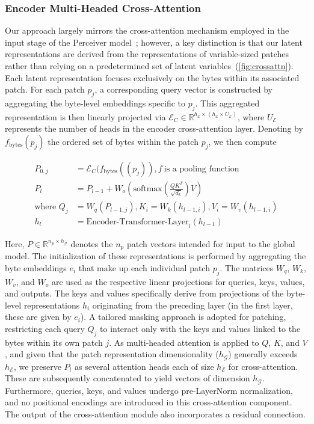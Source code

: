 \subsubsection{Encoder Multi-Headed Cross-Attention}
\label{sec:enc-cross-attn}
Our approach largely mirrors the cross-attention mechanism employed in the input stage of the Perceiver model~\citep{jaegle2021perceiver}; however, a key distinction is that our latent representations are derived from the representations of variable-sized patches rather than relying on a predetermined set of latent variables~(\autoref{fig:crossattn}). Each latent representation focuses exclusively on the bytes within its associated patch. For each patch $p_j$, a corresponding query vector is constructed by aggregating the byte-level embeddings specific to $p_j$. This aggregated representation is then linearly projected via $\mathcal{E}_{C} \in \mathbb{R}^{h_{\mathcal{E}} \times (h_{\mathcal{E}} \times U_{\mathcal{E}})}$, where $U_{\mathcal{E}}$ represents the number of heads in the encoder cross-attention layer. Denoting by $f_{\text{bytes}}(p_j)$ the ordered set of bytes within the patch $p_j$, we then compute

\begin{align}
P_{0,j} &= \mathcal{E}_{C}(f_\text{bytes}((p_j)), f~ \text{is a pooling function} \\
P_l &= P_{l-1} + W_o\left(\text{softmax}\left(\frac{QK^T}{\sqrt{d_k}}\right)V\right) \\
\text{where } Q_j &= W_q(P_{l-1,j}), K_i = W_k(h_{l-1,i}), V_i = W_v(h_{l-1,i}) \\
h_l &= \text{Encoder-Transformer-Layer}_l(h_{l-1})
\end{align}

Here, $P \in \mathbb{R}^{n_p \times h_{\mathcal{G}}}$ denotes the $n_p$ patch vectors intended for input to the global model. The initialization of these representations is performed by aggregating the byte embeddings $e_i$ that make up each individual patch $p_j$. The matrices $W_q$, $W_k$, $W_v$, and $W_o$ are used as the respective linear projections for queries, keys, values, and outputs. The keys and values specifically derive from projections of the byte-level representations $h_i$ originating from the preceding layer (in the first layer, these are given by $e_i$). A tailored masking approach is adopted for patching, restricting each query $Q_j$ to interact only with the keys and values linked to the bytes within its own patch $j$. As multi-headed attention is applied to $Q$, $K$, and $V$, and given that the patch representation dimensionality ($h_{\mathcal{G}}$) generally exceeds $h_{\mathcal{E}}$, we preserve $P_l$ as several attention heads each of size $h_{\mathcal{E}}$ for cross-attention. These are subsequently concatenated to yield vectors of dimension $h_{\mathcal{G}}$. Furthermore, queries, keys, and values undergo pre-LayerNorm normalization, and no positional encodings are introduced in this cross-attention component. The output of the cross-attention module also incorporates a residual connection.

